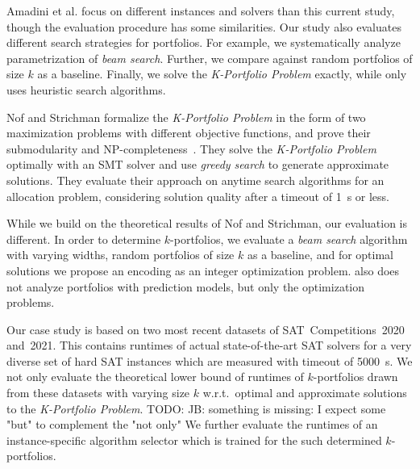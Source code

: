 \documentclass[conference]{IEEEtran}
\newcommand{\todo}[1]{{\color{red}TODO: #1}}
\begin{document}
Amadini et al. focus on different instances and solvers than this current study, though the evaluation procedure has some similarities.
Our study also evaluates different search strategies for portfolios.
For example, we systematically analyze parametrization of \emph{beam search}. %
Further, we compare against random portfolios of size $k$ as a baseline.
Finally, we solve the \emph{K-Portfolio Problem} exactly, %
while \cite{amadini2014empirical} only uses heuristic search algorithms. 

Nof and Strichman formalize the \emph{K-Portfolio Problem} in the form of two maximization problems with different objective functions, and prove their submodularity and NP-completeness~\cite{nof2020real}. 
They solve the \emph{K-Portfolio Problem} optimally with an SMT solver and use \emph{greedy search} to generate approximate solutions.
They evaluate their approach on anytime search algorithms for an allocation problem, considering solution quality after a timeout of 1~s or less.

While we build on the theoretical results of Nof and Strichman, our evaluation is different. %
In order to determine $k$-portfolios, we evaluate a \emph{beam search} algorithm with varying widths, random portfolios of size $k$ as a baseline, and for optimal solutions we propose an encoding as an integer optimization problem.
\cite{nof2020real} also does not analyze portfolios with prediction models, but only the optimization problems.

Our case study is based on two most recent datasets of SAT~Competitions~2020 and~2021.
This contains runtimes of actual state-of-the-art SAT solvers for a very diverse set of hard SAT instances which are measured with timeout of 5000~s.
We not only evaluate the theoretical lower bound of runtimes of $k$-portfolios drawn from these datasets with varying size $k$ w.r.t.\ optimal and approximate solutions to the \emph{K-Portfolio Problem}. 
\todo{JB: something is missing: I expect some "but" to complement the "not only"} 
We further evaluate the runtimes of an instance-specific algorithm selector which is trained for the such determined $k$-portfolios. %
\end{document}
